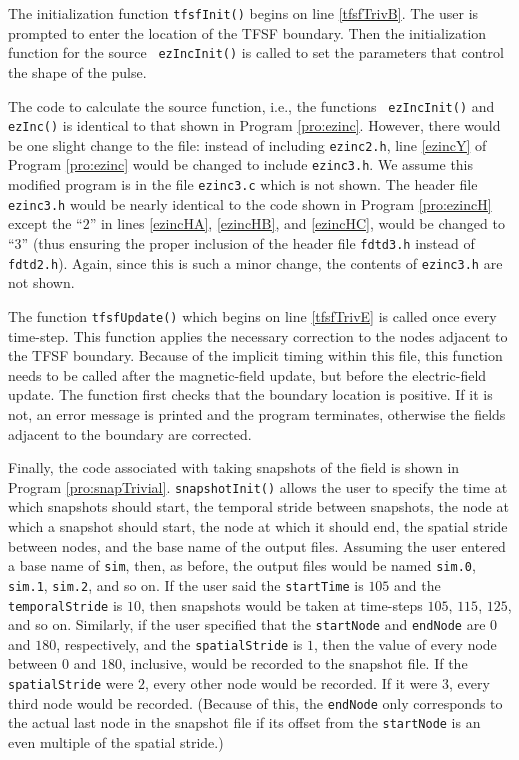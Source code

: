 The initialization function {\tt tfsfInit()} begins on line
\ref{tfsfTrivB}.  The user is prompted to enter the location of the
TFSF boundary.  Then the initialization function for the source {\tt
  ezIncInit()} is called to set the parameters that control the shape
of the pulse.  

The code to calculate the source function, i.e., the functions {\tt
  ezIncInit()} and {\tt ezInc()} is identical to that shown in Program
\ref{pro:ezinc}.  However, there would be one slight change to the
file: instead of including {\tt ezinc2.h}, line \ref{ezincY} of
Program \ref{pro:ezinc} would be changed to include {\tt ezinc3.h}.
We assume this modified program is in the file {\tt ezinc3.c} which is
not shown.  The header file {\tt ezinc3.h} would be nearly identical
to the code shown in Program \ref{pro:ezincH} except the ``$2$'' in
lines \ref{ezincHA}, \ref{ezincHB}, and \ref{ezincHC}, would be
changed to ``$3$'' (thus ensuring the proper inclusion of the header
file {\tt fdtd3.h} instead of {\tt fdtd2.h}).  Again, since this is
such a minor change, the contents of {\tt ezinc3.h} are not shown.

The function {\tt tfsfUpdate()} which begins on line \ref{tfsfTrivE}
is called once every time-step.  This function applies the necessary
correction to the nodes adjacent to the TFSF boundary.  Because of the
implicit timing within this file, this function needs to be called
after the magnetic-field update, but before the electric-field update.
The function first checks that the boundary location is positive.  If
it is not, an error message is printed and the program terminates,
otherwise the fields adjacent to the boundary are corrected.

Finally, the code associated with taking snapshots of the field is
shown in Program \ref{pro:snapTrivial}.  {\tt snapshotInit()} allows
the user to specify the time at which snapshots should start, the
temporal stride between snapshots, the node at which a snapshot should
start, the node at which it should end, the spatial stride between
nodes, and the base name of the output files.  Assuming the user
entered a base name of {\tt sim}, then, as before, the output files
would be named {\tt sim.0}, {\tt sim.1}, {\tt sim.2}, and so on.  If
the user said the {\tt startTime} is $105$ and the {\tt
temporalStride} is $10$, then snapshots would be taken at time-steps
$105$, $115$, $125$, and so on.  Similarly, if the user specified that
the {\tt startNode} and {\tt endNode} are $0$ and $180$, respectively,
and the {\tt spatialStride} is $1$, then the value of every node
between $0$ and $180$, inclusive, would be recorded to the snapshot
file.  If the {\tt spatialStride} were $2$, every other node would be
recorded.  If it were $3$, every third node would be recorded.
(Because of this, the {\tt endNode} only corresponds to the actual
last node in the snapshot file if its offset from the {\tt startNode}
is an even multiple of the spatial stride.)

